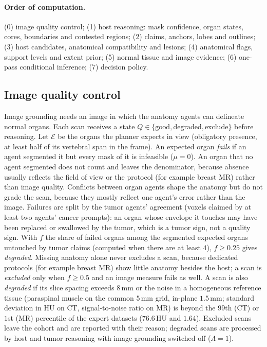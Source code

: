 \documentclass[fleqn,10pt]{olplainarticle}
\begin{document}
\paragraph{Order of computation.} (0) image quality control; (1) host reasoning: mask confidence, organ states, cores,
boundaries and contested regions; (2) claims, anchors, lobes and outlines; (3) host candidates, anatomical compatibility
and lesions; (4) anatomical flags, support levels and extent prior; (5) normal tissue and image evidence; (6) one-pass
conditional inference; (7) decision policy.

\subsection{Image quality control}
\label{sec:qc_details}
Image grounding needs an image in which the anatomy agents can delineate normal organs. Each scan receives a state
$Q\in\{\text{good},\text{degraded},\text{exclude}\}$ before reasoning. Let $\mathcal{E}$ be the organs the planner expects in
view (obligatory presence, at least half of its vertebral span in the frame). An expected organ \emph{fails} if an agent
segmented it but every mask of it is infeasible ($\mu=0$). An organ that no agent segmented does not count and leaves the
denominator, because absence usually reflects the field of view or the protocol (for example breast MR) rather than image
quality. Conflicts between organ agents shape the anatomy but do not grade the scan, because they mostly reflect one
agent's error rather than the image. Failures are split by the tumor agents' agreement (voxels claimed by at
least two agents' cancer prompts): an organ whose envelope it touches may have been replaced or swallowed by the tumor,
which is a tumor sign, not a quality sign. With $f$ the share of failed organs among the
segmented expected organs untouched by tumor claims (computed when there are at least $4$), $f\ge0.25$ gives \emph{degraded}. Missing
anatomy alone never excludes a scan, because dedicated protocols (for example breast MR) show little anatomy besides the
host; a scan is \emph{excluded} only when $f\ge0.5$ and an image measure fails as well. A scan is also \emph{degraded} if its slice spacing exceeds $8$\,mm or the noise in a
homogeneous reference tissue (paraspinal muscle on the common $5$\,mm grid, in-plane $1.5$\,mm; standard deviation in HU on
CT, signal-to-noise ratio on MR) is beyond the $99$th (CT) or $1$st (MR) percentile of the expert datasets
($76.6$\,HU and $1.64$). Excluded scans leave the cohort and are reported with their reason; degraded scans
are processed by host and tumor reasoning with image grounding switched off ($\Lambda=1$).
\end{document}
